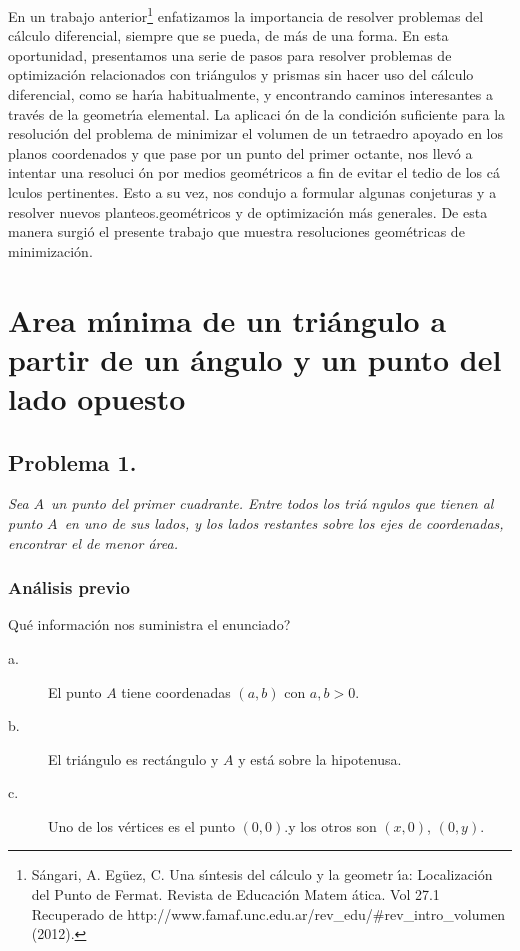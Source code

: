 \documentclass[a4paper,spanish]{article}
\begin{document}
En un trabajo anterior\footnote{%
S\'{a}ngari, A. Eg\"{u}ez, C. Una s\'{\i}ntesis del c\'{a}lculo y la geometr%
\'{\i}a: Localizaci\'{o}n del Punto de Fermat. Revista de Educaci\'{o}n Matem%
\'{a}tica. Vol 27.1 Recuperado de
http://www.famaf.unc.edu.ar/rev\_edu/\#rev\_intro\_volumen (2012).}
enfatizamos la importancia de resolver problemas del c\'{a}lculo
diferencial, siempre que se pueda, de m\'{a}s de una forma. En esta
oportunidad, presentamos una serie de pasos para resolver problemas de
optimizaci\'{o}n relacionados con tri\'{a}ngulos y prismas sin hacer uso del
c\'{a}lculo diferencial, como se har\'{\i}a habitualmente, y encontrando
caminos interesantes a trav\'{e}s de la geometr\'{\i}a elemental. La aplicaci%
\'{o}n de la condici\'{o}n suficiente para la resoluci\'{o}n del problema de
minimizar el volumen de un tetraedro apoyado en los planos coordenados y que
pase por un punto del primer octante, nos llev\'{o} a intentar una resoluci%
\'{o}n por medios geom\'{e}tricos a fin de evitar el tedio de los c\'{a}%
lculos pertinentes. Esto a su vez, nos condujo a formular algunas conjeturas
y a resolver nuevos planteos.geom\'{e}tricos y de optimizaci\'{o}n m\'{a}s
generales. De esta manera surgi\'{o} el presente trabajo que muestra
resoluciones geom\'{e}tricas de minimizaci\'{o}n.

\section{Area m\'{\i}nima de un tri\'{a}ngulo a partir de un \'{a}ngulo y un
punto del lado opuesto}

\subsection{Problema 1.}

\emph{Sea }$A$\emph{\ un punto del primer cuadrante. Entre todos los tri\'{a}%
ngulos que tienen al punto }$A$\emph{\ en uno de sus lados, y los lados
restantes sobre los ejes de coordenadas, encontrar el de menor \'{a}rea.}

\subsubsection{An\'{a}lisis previo}

\textquestiondown Qu\'{e} informaci\'{o}n nos suministra el enunciado?

\begin{description}
\item[a.] El punto $A$ tiene coordenadas $\left( a,b\right) $ con $a,b>0$.

\item[b.] El tri\'{a}ngulo es rect\'{a}ngulo y $A$ y est\'{a} sobre la
hipotenusa.

\item[c.] Uno de los v\'{e}rtices es el punto $\left( 0,0\right) $.y los
otros son $\left( x,0\right) $, $\left( 0,y\right) $.
\end{description}
\end{document}
